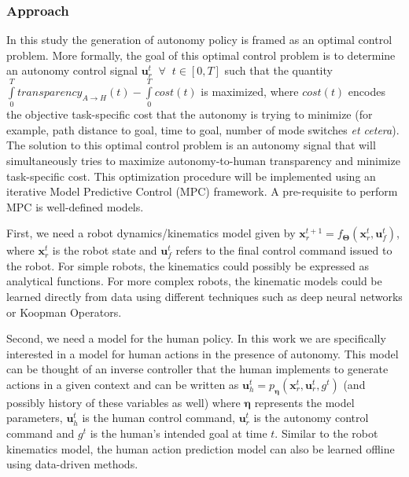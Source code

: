 \documentclass[12pt]{article}
\begin{document}
\subsubsection{Approach}
In this study the generation of autonomy policy is framed as an optimal control problem. More formally, the goal of this optimal control problem is to determine an autonomy control signal 
$\boldsymbol{u}_r^t \;\;\forall \;\; t \in [0, T]$ such that the quantity $ \int\limits_{0}^{T} transparency_{A \rightarrow H}(t)-\int\limits_{0}^{T}cost(t)$ is maximized, where $cost(t)$ encodes the objective task-specific cost that the autonomy is trying to minimize (for example, path distance to goal, time to goal, number of mode switches \textit{et cetera}). The solution to this optimal control problem is an autonomy signal that will simultaneously tries to maximize autonomy-to-human transparency and minimize task-specific cost. This optimization procedure will be implemented using an iterative Model Predictive Control (MPC) framework. A pre-requisite to perform MPC is well-defined models. 

First, we need a robot dynamics/kinematics model given by $\boldsymbol{x}_r^{t+1} = f_{\boldsymbol{\Theta}}(\boldsymbol{x}_r^{t}, \boldsymbol{u}_f^{t})$, where $\boldsymbol{x}_r^t$ is the robot state and $\boldsymbol{u}_f^t$ refers to the final control command issued to the robot. For simple robots, the kinematics could possibly be expressed as analytical functions. For more complex robots, the kinematic models could be learned directly from data using different techniques such as deep neural networks or Koopman Operators. 

Second, we need a model for the human policy. In this work we are specifically interested in a model for human actions in the presence of autonomy. This model can be thought of an inverse controller that the human implements to generate actions in a given context and can be written as $\boldsymbol{u}_h^{t} = p_{\boldsymbol{\eta}}(\boldsymbol{x}_r^{t}, \boldsymbol{u}_r^{t}, g^t)$ (and possibly history of these variables as well) where $\boldsymbol{\eta}$ represents the model parameters, $\boldsymbol{u}_h^t$ is the human control command, $\boldsymbol{u}_r^t$ is the autonomy control command and $g^t$ is the human's intended goal at time $t$. Similar to the robot kinematics model, the human action prediction model can also be learned offline using data-driven methods.
\end{document}
